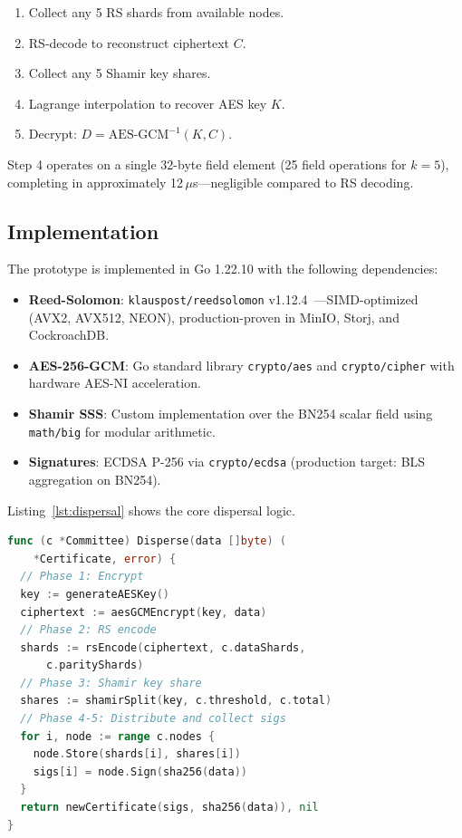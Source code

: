 \begin{enumerate}
  \item Collect any 5 RS shards from available nodes.
  \item RS-decode to reconstruct ciphertext $C$.
  \item Collect any 5 Shamir key shares.
  \item Lagrange interpolation to recover AES key $K$.
  \item Decrypt: $D = \text{AES-GCM}^{-1}(K, C)$.
\end{enumerate}

Step 4 operates on a single 32-byte field element (25 field operations
for $k = 5$), completing in approximately 12\,$\mu$s---negligible
compared to RS decoding.

\subsection{Implementation}

The prototype is implemented in Go 1.22.10 with the following
dependencies:

\begin{itemize}
  \item \textbf{Reed-Solomon}: \texttt{klauspost/reedsolomon}
    v1.12.4~\cite{klauspost}---SIMD-optimized (AVX2, AVX512, NEON),
    production-proven in MinIO, Storj, and CockroachDB.
  \item \textbf{AES-256-GCM}: Go standard library \texttt{crypto/aes}
    and \texttt{crypto/cipher} with hardware AES-NI acceleration.
  \item \textbf{Shamir SSS}: Custom implementation over the BN254 scalar
    field using \texttt{math/big} for modular arithmetic.
  \item \textbf{Signatures}: ECDSA P-256 via \texttt{crypto/ecdsa}
    (production target: BLS aggregation on BN254).
\end{itemize}

Listing~\ref{lst:dispersal} shows the core dispersal logic.

\begin{lstlisting}[language=Go, caption={Core dispersal function
  (simplified)}, label=lst:dispersal]
func (c *Committee) Disperse(data []byte) (
    *Certificate, error) {
  // Phase 1: Encrypt
  key := generateAESKey()
  ciphertext := aesGCMEncrypt(key, data)
  // Phase 2: RS encode
  shards := rsEncode(ciphertext, c.dataShards,
      c.parityShards)
  // Phase 3: Shamir key share
  shares := shamirSplit(key, c.threshold, c.total)
  // Phase 4-5: Distribute and collect sigs
  for i, node := range c.nodes {
    node.Store(shards[i], shares[i])
    sigs[i] = node.Sign(sha256(data))
  }
  return newCertificate(sigs, sha256(data)), nil
}
\end{lstlisting}

